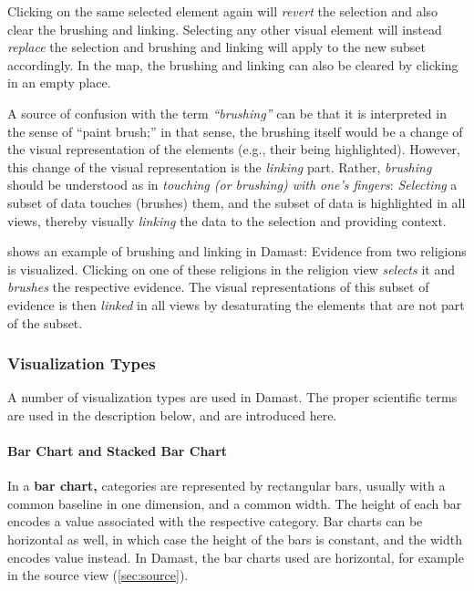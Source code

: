 Clicking on the same selected element again will \emph{revert} the selection and also clear the brushing and linking.
Selecting any other visual element will instead \emph{replace} the selection and brushing and linking will apply to the new subset accordingly.
In the map, the brushing and linking can also be cleared by clicking in an empty place.

A source of confusion with the term \emph{\enquote{brushing}} can be that it is interpreted in the sense of \enquote{paint brush;}
in that sense, the brushing itself would be a change of the visual representation of the elements (e.g., their being highlighted).
However, this change of the visual representation is the \emph{linking} part.
Rather, \emph{brushing} should be understood as in \emph{touching (or brushing) with one's fingers}:
\emph{Selecting} a subset of data touches (brushes) them, and the subset of data is highlighted in all views, thereby visually \emph{linking} the data to the selection and providing context.

 shows an example of brushing and linking in Damast:
Evidence from two religions is visualized.
Clicking on one of these religions in the religion view \emph{selects} it and \emph{brushes} the respective evidence.
The visual representations of this subset of evidence is then \emph{linked} in all views by desaturating the elements that are not part of the subset.


\subsubsection{Visualization Types}

A number of visualization types are used in Damast.
The proper scientific terms are used in the description below, and are introduced here.

\paragraph{Bar Chart and Stacked Bar Chart}
In a \textbf{bar chart,} categories are represented by rectangular bars, usually with a common baseline in one dimension, and a common width.
The height of each bar encodes a value associated with the respective category.
Bar charts can be horizontal as well, in which case the height of the bars is constant, and the width encodes value instead.
In Damast, the bar charts used are horizontal, for example in the source view (\cref{sec:source}).

